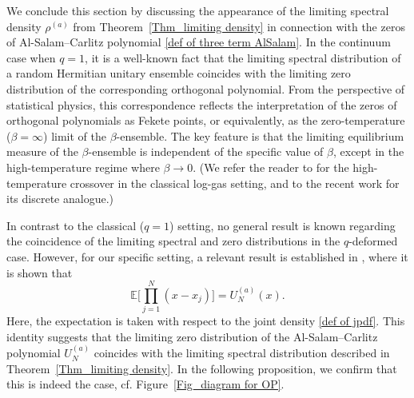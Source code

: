 \documentclass{amsart}
\theoremstyle{plain}
\theoremstyle{remark}
\numberwithin{equation}{section}
\begin{document}
 
We conclude this section by discussing the appearance of the limiting spectral density $\rho^{(a)}$ from Theorem~\ref{Thm_limiting density} in connection with the zeros of Al-Salam--Carlitz polynomial \eqref{def of three term AlSalam}. In the continuum case when $q = 1$, it is a well-known fact that the limiting spectral distribution of a random Hermitian unitary ensemble coincides with the limiting zero distribution of the corresponding orthogonal polynomial. From the perspective of statistical physics, this correspondence reflects the interpretation of the zeros of orthogonal polynomials as Fekete points, or equivalently, as the zero-temperature ($\beta = \infty$) limit of the $\beta$-ensemble. The key feature is that the limiting equilibrium measure of the $\beta$-ensemble is independent of the specific value of $\beta$, except in the high-temperature regime where $\beta \to 0$. (We refer the reader to \cite{ABG12} for the high-temperature crossover in the classical log-gas setting, and to the recent work \cite{CD25} for its discrete analogue.)


In contrast to the classical ($q=1$) setting, no general result is known regarding the coincidence of the limiting spectral and zero distributions in the $q$-deformed case. However, for our specific setting, a relevant result is established in \cite[Proposition 4.2]{BF25a}, where it is shown that
\begin{equation}
\mathbb{E}\bigg[\prod_{j=1}^N (x - x_j)\bigg] = U_N^{(a)}(x).
\end{equation}
Here, the expectation is taken with respect to the joint density \eqref{def of jpdf}. This identity suggests that the limiting zero distribution of the Al-Salam--Carlitz polynomial $U_N^{(a)}$ coincides with the limiting spectral distribution described in Theorem~\ref{Thm_limiting density}. In the following proposition, we confirm that this is indeed the case, cf. Figure~\ref{Fig_diagram for OP}. 
\end{document}
